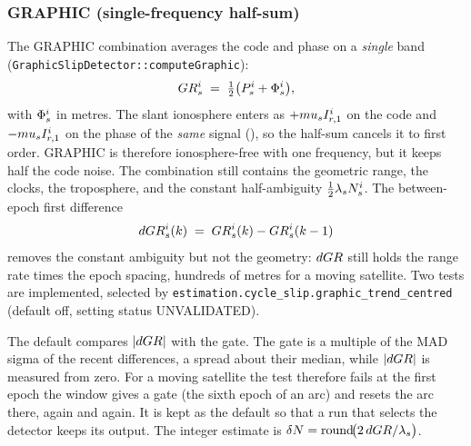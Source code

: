 \documentclass[main.tex]{subfiles}
\begin{document}
\subsubsection{GRAPHIC (single-frequency half-sum)}\label{sec:slip-graphic}

The GRAPHIC combination averages the code and phase on a \emph{single}
band (\texttt{GraphicSlipDetector::computeGraphic}):
\begin{equation}
GR^i_{s}
\;=\;
\tfrac{1}{2}\bigl(P^i_{s} + \Phi^i_{s}\bigr),
\label{eq:graphic}
\end{equation}
with $\Phi^i_s$ in metres.  The slant ionosphere enters as
$+mu_s I^i_{r,1}$ on the code and $-mu_s I^i_{r,1}$
on the phase of the \emph{same} signal
(), so the half-sum cancels it to first order.
GRAPHIC is therefore ionosphere-free with one frequency, but it keeps
half the code noise.  The combination still contains the geometric
range, the clocks, the troposphere, and the constant half-ambiguity
$\tfrac12 \lambda_s N^i_s$.  The between-epoch first
difference
\begin{equation}
dGR^i_s(k)
\;=\;
GR^i_s(k) - GR^i_s(k-1)
\label{eq:graphic-diff}
\end{equation}
removes the constant ambiguity but not the geometry: $dGR$
still holds the range rate times the epoch spacing, hundreds of metres for a
moving satellite.  Two tests are implemented, selected by
\texttt{estimation.cycle\_slip.graphic\_trend\_centred} (default off, setting
status UNVALIDATED).

The default compares $\lvert dGR\rvert$ with the gate.  The gate
is a multiple of the MAD sigma of the recent differences, a spread about their
median, while $\lvert dGR\rvert$ is measured from zero.  For a
moving satellite the test therefore fails at the first epoch the window gives a
gate (the sixth epoch of an arc) and resets the arc there, again and again.  It
is kept as the default so that a run that selects the detector keeps its
output.  The integer estimate is
$\delta N = \operatorname{round}\!\bigl(2\,dGR / \lambda_s\bigr)$.
\end{document}

